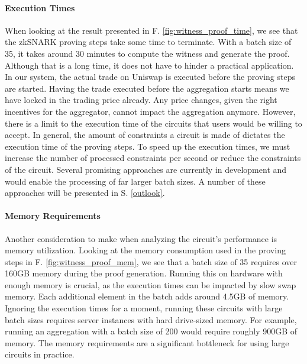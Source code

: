 \documentclass[../../thesis.tex]{subfiles}
\begin{document}
\paragraph{Execution Times}
When looking at the result presented in F. \ref{fig:witness_proof_time}, we see that the zkSNARK proving steps take some time to terminate. With a batch size of 35, it takes around 30 minutes to compute the witness and generate the proof. Although that is a long time, it does not have to hinder a practical application. In our system, the actual trade on Uniswap is executed before the proving steps are started. Having the trade executed before the aggregation starts means we have locked in the trading price already. Any price changes, given the right incentives for the aggregator, cannot impact the aggregation anymore. However, there is a limit to the execution time of the circuits that users would be willing to accept. In general, the amount of constraints a circuit is made of dictates the execution time of the proving steps. To speed up the execution times, we must increase the number of processed constraints per second or reduce the constraints of the circuit. Several promising approaches are currently in development and would enable the processing of far larger batch sizes. A number of these approaches will be presented in S. \ref{outlook}.

\paragraph{Memory Requirements}
Another consideration to make when analyzing the circuit's performance is memory utilization. Looking at the memory consumption used in the proving steps in F. \ref{fig:witness_proof_mem}, we see that a batch size of 35 requires over 160GB memory during the proof generation. Running this on hardware with enough memory is crucial, as the execution times can be impacted by slow swap memory. Each additional element in the batch adds around 4.5GB of memory. Ignoring the execution times for a moment, running these circuits with large batch sizes requires server instances with hard drive-sized memory. For example, running an aggregation with a batch size of 200 would require roughly 900GB of memory. The memory requirements are a significant bottleneck for using large circuits in practice.
\end{document}

